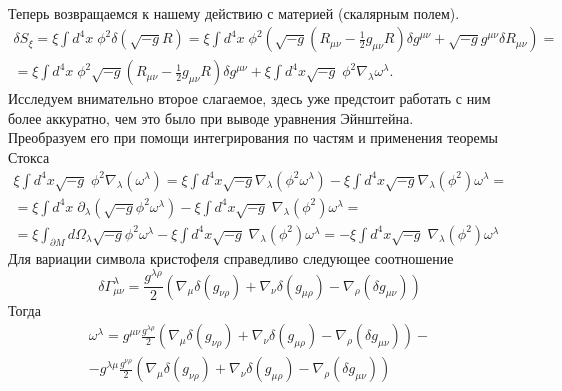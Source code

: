 \documentclass[12pt]{article}
\theoremstyle{definition}
\begin{document}
\begin{enumerate}
\begin{multline}
\end{multline}
Теперь возвращаемся к нашему действию с материей (скалярным полем).
\begin{multline}
    \delta S_{\xi}=\xi\int d^4x\; \phi^2 \delta(\sqrt{-g}R)=\xi\int d^4x\; \phi^2 \left(\sqrt{-g}\left(R_{\mu\nu}-\frac{1}{2}g_{\mu\nu}R\right)\delta g^{\mu\nu}+\sqrt{-g}g^{\mu\nu}\delta R_{\mu\nu}\right)=\\
    = \xi\int d^4x\; \phi^2 \sqrt{-g}\left(R_{\mu\nu}-\frac{1}{2}g_{\mu\nu}R\right)\delta g^{\mu\nu}+\xi \int d^4x \sqrt{-g}\;\phi^2\nabla_\lambda\omega^\lambda.
\end{multline}
Исследуем внимательно второе слагаемое, здесь уже предстоит работать с ним более аккуратно, чем это было при выводе уравнения Эйнштейна.\\
 Преобразуем его при помощи интегрирования по частям и применения теоремы Стокса
\begin{multline}\label{eq10}
    \xi \int d^4x \sqrt{-g}\;\phi^2\nabla_\lambda\left(\omega^\lambda\right)=\xi \int d^4x \sqrt{-g}\nabla_\lambda\left(\phi^2\omega^\lambda\right)-\xi \int d^4x \sqrt{-g}\nabla_\lambda\left(\phi^2\right)\omega^\lambda=\\
    =\xi \int d^4x\; \partial_\lambda\left(\sqrt{-g}\phi^2\omega^\lambda\right)-\xi \int d^4x \sqrt{-g}\;\nabla_\lambda\left(\phi^2\right)\omega^\lambda=\\=\xi \int_{\partial M} d\Omega_{\lambda}\sqrt{-g}\phi^2\omega^\lambda-\xi \int d^4x \sqrt{-g}\;\nabla_\lambda\left(\phi^2\right)\omega^\lambda
    =-\xi \int d^4x \sqrt{-g}\;\nabla_\lambda\left(\phi^2\right)\omega^\lambda
\end{multline}
Для вариации символа кристофеля справедливо следующее соотношение
\begin{equation}
    \delta \Gamma^{\lambda}_{\mu\nu} = \frac{g^{\lambda\rho}}{2}\left(\nabla_{\mu}\delta \left(g_{\nu\rho}\right)+ \nabla_{\nu}\delta \left(g_{\mu\rho}\right)-\nabla_\rho\left(\delta g_{\mu\nu}\right)\right)
\end{equation}
Тогда
\begin{multline}
   \omega^\lambda=g^{\mu\nu}\frac{g^{\lambda\rho}}{2}\left(\nabla_{\mu}\delta \left(g_{\nu\rho}\right)+ \nabla_{\nu}\delta \left(g_{\mu\rho}\right)-\nabla_\rho\left(\delta g_{\mu\nu}\right)\right)-\\
   -g^{\lambda\mu}\frac{g^{\nu\rho}}{2}\left(\nabla_{\mu}\delta \left(g_{\nu\rho}\right)+ \nabla_{\nu}\delta \left(g_{\mu\rho}\right)- \nabla_\rho\left(\delta g_{\mu\nu}\right)\right)
\end{multline}

\end{enumerate}
\end{document}
